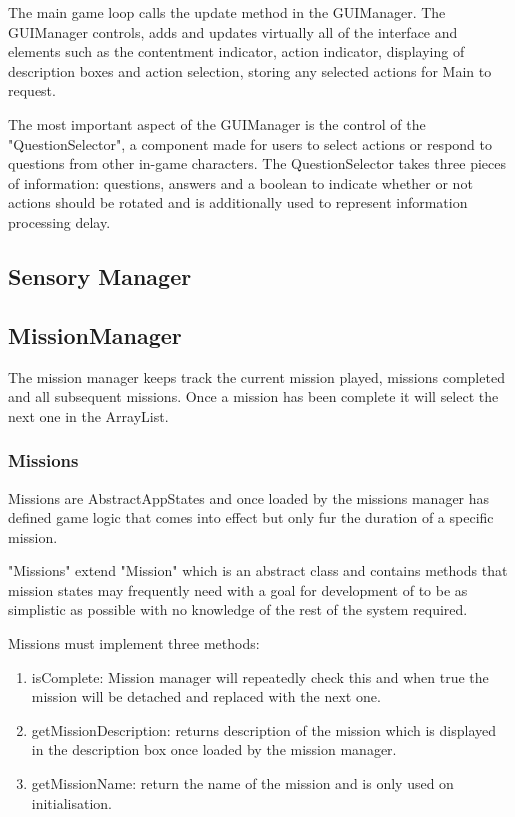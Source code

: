 The main game loop calls the update method in the GUIManager. The GUIManager controls, adds and updates virtually all of the interface and elements such as the contentment indicator, action indicator, displaying of description boxes and action selection, storing any selected actions for Main to request. 

The most important aspect of the GUIManager is the control of the "QuestionSelector", a component made for users to select actions or respond to questions from other in-game characters. The QuestionSelector takes three pieces of information: questions, answers and a boolean to indicate whether or not actions should be rotated and is additionally used to represent information processing delay.

\subsection{Sensory Manager}


\subsection{MissionManager}
The mission manager keeps track the current mission played, missions completed and all subsequent missions. Once a mission has been complete it will select the next one in the ArrayList. 


\subsubsection*{Missions}
Missions are AbstractAppStates and once loaded by the missions manager has defined game logic that comes into effect but only fur the duration of a specific mission. 

"Missions" extend "Mission" which is an abstract class and contains methods that mission states may frequently need with a goal for development of to be as simplistic as possible with no knowledge of the rest of the system required.

Missions must implement three methods:
\begin{enumerate}
\item isComplete: Mission manager will repeatedly check this and when true the mission will be detached and replaced with the next one. 
\item getMissionDescription: returns description of the mission which is displayed in the description box once loaded by the mission manager. 
\item getMissionName: return the name of the mission and is only used on initialisation. 
\end{enumerate}

